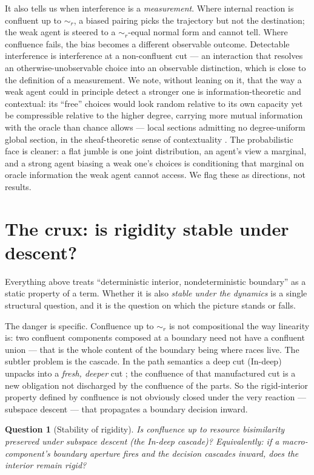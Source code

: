 \documentclass[11pt]{article}
\theoremstyle{definition}
\theoremstyle{plain}
\newtheorem{question}{Question}
\theoremstyle{remark}
\newcommand{\rbisim}{\sim_{r}}
\begin{document}
It also tells us when interference is a \emph{measurement}. Where internal reaction
is confluent up to $\rbisim$, a biased pairing picks the trajectory but not the
destination; the weak agent is steered to a $\rbisim$-equal normal form and cannot
tell. Where confluence fails, the bias becomes a different observable outcome.
Detectable interference is interference at a non-confluent cut --- an interaction
that resolves an otherwise-unobservable choice into an observable distinction,
which is close to the definition of a measurement. We note, without leaning on it,
that the way a weak agent could in principle detect a stronger one is
information-theoretic and contextual: its ``free'' choices would look random
relative to its own capacity yet be compressible relative to the higher degree,
carrying more mutual information with the oracle than chance allows --- local
sections admitting no degree-uniform global section, in the
sheaf-theoretic sense of contextuality \cite{abramsky}. The probabilistic face is
cleaner: a flat jumble is one joint distribution, an agent's view a marginal, and a
strong agent biasing a weak one's choices is conditioning that marginal on oracle
information the weak agent cannot access. We flag these as directions, not results.

\section{The crux: is rigidity stable under descent?}\label{sec:crux}

Everything above treats ``deterministic interior, nondeterministic boundary'' as a
static property of a term. Whether it is also \emph{stable under the dynamics} is a
single structural question, and it is the question on which the picture stands or
falls.

The danger is specific. Confluence up to $\rbisim$ is not compositional the way
linearity is: two confluent components composed at a boundary need not have a
confluent union --- that is the whole content of the boundary being where races
live. The subtler problem is the cascade. In the path semantics a deep cut
(In-deep) unpacks into a \emph{fresh, deeper} cut \cite{paths}; the confluence of
that manufactured cut is a new obligation not discharged by the confluence of the
parts. So the rigid-interior property defined by confluence is not obviously closed
under the very reaction --- subspace descent --- that propagates a boundary
decision inward.

\begin{question}[Stability of rigidity]\label{q:crux}
Is confluence up to resource bisimilarity preserved under subspace descent (the
In-deep cascade)? Equivalently: if a macro-component's boundary aperture fires and
the decision cascades inward, does the interior remain rigid?
\end{question}
\end{document}
